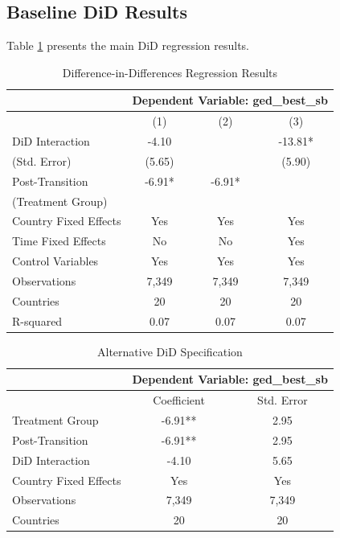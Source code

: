 \documentclass[12pt]{article}
\begin{document}
\subsection{Baseline DiD Results}

Table \ref{tab:main_results} presents the main DiD regression results.

\begin{table}[htbp]
\centering
\caption{Difference-in-Differences Regression Results}
\label{tab:main_results}
\begin{tabular}{lccc}
\toprule
{} & \multicolumn{3}{c}{Dependent Variable: ged\_best\_sb} \\
\midrule
{} & (1) & (2) & (3) \\
\midrule
DiD Interaction & -4.10 & & -13.81* \\
(Std. Error) & (5.65) & & (5.90) \\
Post-Transition & -6.91* & -6.91* & \\
(Treatment Group) & & & \\
\midrule
Country Fixed Effects & Yes & Yes & Yes \\
Time Fixed Effects & No & No & Yes \\
Control Variables & Yes & Yes & Yes \\
\midrule
Observations & 7,349 & 7,349 & 7,349 \\
Countries & 20 & 20 & 20 \\
R-squared & 0.07 & 0.07 & 0.07 \\
\bottomrule
\end{tabular}
\end{table}

\begin{table}[htbp]
\centering
\caption{Alternative DiD Specification}
\label{tab:alt_results}
\begin{tabular}{lcc}
\toprule
{} & \multicolumn{2}{c}{Dependent Variable: ged\_best\_sb} \\
\midrule
{} & Coefficient & Std. Error \\
\midrule
Treatment Group & -6.91** & 2.95 \\
Post-Transition & -6.91** & 2.95 \\
DiD Interaction & -4.10 & 5.65 \\
\midrule
Country Fixed Effects & Yes & Yes \\
\midrule
Observations & 7,349 & 7,349 \\
Countries & 20 & 20 \\
\bottomrule
\end{tabular}
\end{table}
\end{document}
